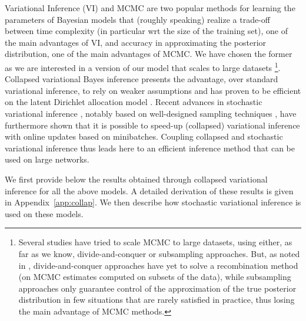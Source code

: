 Variational Inference (VI) and MCMC are two popular methods for learning the parameters of Bayesian models that (roughly speaking) realize a trade-off between time complexity (in particular wrt the size of the training set), one of the main advantages of VI, and accuracy in approximating the posterior distribution, one of the main advantages of MCMC. We have chosen the former as we are interested in a version of our model that scales to large datasets \footnote{Several studies have tried to scale MCMC to large datasets, using either, as far as we know, divide-and-conquer or subsampling approaches. But, as noted in \cite{Bardenet2017}, divide-and-conquer approaches have yet to solve a recombination method (on MCMC estimates computed on subsets of the data), while subsampling approaches only guarantee control of the approximation of the true posterior distribution in few situations that are rarely satisfied in practice, thus losing the main advantage of MCMC methods.}.
Collapsed variational Bayes inference presents the advantage, over standard variational inference, to rely on weaker assumptions and has proven to be efficient on the latent Dirichlet allocation model \cite{teh2007collapsed}. Recent advances in stochastic variational inference \cite{hoffman2013stochastic}, notably based on well-designed sampling techniques \cite{gopalan2013efficient,kim2013efficient}, have furthermore shown that it is possible to speed-up (collapsed) variational inference with online updates based on minibatches.
Coupling collapsed and stochastic variational inference thus leads here to an efficient inference method that can be used on large networks.

We first provide below the results obtained through collapsed variational inference for all the above models. A detailed derivation of these results is given in Appendix~\ref{app:collap}. We then describe how stochastic variational inference is used on these models.

